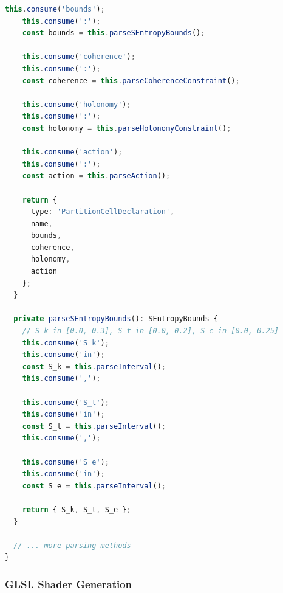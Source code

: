 \documentclass[12pt,a4paper]{article}
\begin{document}
\begin{lstlisting}[language=TypeScript, basicstyle=\ttfamily\small]
    this.consume('bounds');
    this.consume(':');
    const bounds = this.parseSEntropyBounds();
    
    this.consume('coherence');
    this.consume(':');
    const coherence = this.parseCoherenceConstraint();
    
    this.consume('holonomy');
    this.consume(':');
    const holonomy = this.parseHolonomyConstraint();
    
    this.consume('action');
    this.consume(':');
    const action = this.parseAction();
    
    return {
      type: 'PartitionCellDeclaration',
      name,
      bounds,
      coherence,
      holonomy,
      action
    };
  }
  
  private parseSEntropyBounds(): SEntropyBounds {
    // S_k in [0.0, 0.3], S_t in [0.0, 0.2], S_e in [0.0, 0.25]
    this.consume('S_k');
    this.consume('in');
    const S_k = this.parseInterval();
    this.consume(',');
    
    this.consume('S_t');
    this.consume('in');
    const S_t = this.parseInterval();
    this.consume(',');
    
    this.consume('S_e');
    this.consume('in');
    const S_e = this.parseInterval();
    
    return { S_k, S_t, S_e };
  }
  
  // ... more parsing methods
}
\end{lstlisting}

\subsubsection{GLSL Shader Generation}
\end{document}
